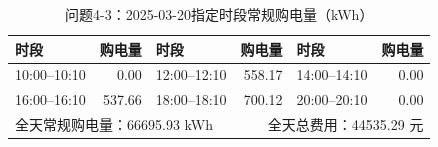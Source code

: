 \begin{table}[H]\centering\small
\caption{问题4-3：2025-03-20指定时段常规购电量（kWh）}
\label{tab:q4_3_0320_purchase}
\begin{tabular}{lrlrlr}\toprule
时段 & 购电量 & 时段 & 购电量 & 时段 & 购电量 \\\midrule
10:00--10:10 & 0.00 & 12:00--12:10 & 558.17 & 14:00--14:10 & 0.00 \\
16:00--16:10 & 537.66 & 18:00--18:10 & 700.12 & 20:00--20:10 & 0.00 \\
\midrule
\multicolumn{3}{l}{全天常规购电量：66695.93 kWh} & \multicolumn{3}{r}{全天总费用：44535.29 元}\\
\bottomrule\end{tabular}\end{table}

